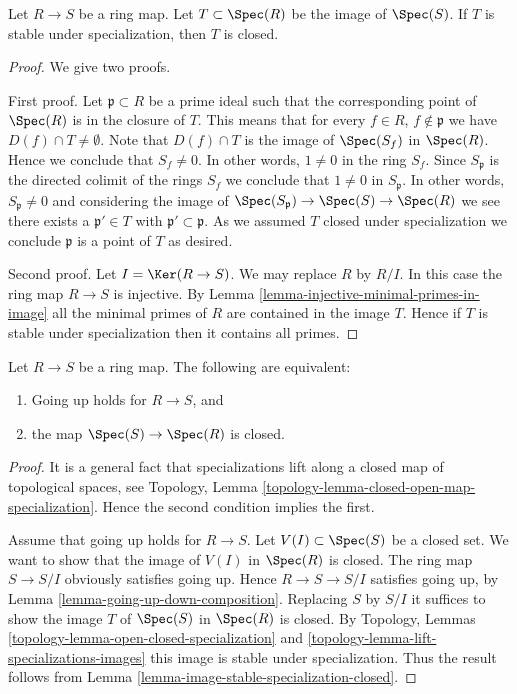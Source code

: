 \begin{lemma}
\label{lemma-image-stable-specialization-closed}
Let $R \to S$ be a ring map. Let $T \subset \Spec(R)$
be the image of $\Spec(S)$. If $T$ is stable under specialization,
then $T$ is closed.
\end{lemma}

\begin{proof}
We give two proofs.

\medskip\noindent
First proof. Let $\mathfrak p \subset R$ be a prime ideal such that
the corresponding point of $\Spec(R)$ is in the closure
of $T$. This means that for every $f \in R$, $f \not \in \mathfrak p$
we have $D(f) \cap T \not = \emptyset$. Note that $D(f) \cap T$
is the image of $\Spec(S_f)$ in $\Spec(R)$. Hence
we conclude that $S_f \not = 0$. In other words, $1 \not = 0$ in
the ring $S_f$. Since $S_{\mathfrak p}$ is the directed colimit
of the rings $S_f$ we conclude that $1 \not = 0$ in
$S_{\mathfrak p}$. In other words, $S_{\mathfrak p} \not = 0$ and
considering the image of $\Spec(S_{\mathfrak p})
\to \Spec(S) \to \Spec(R)$ we see there exists
a $\mathfrak p' \in T$ with $\mathfrak p' \subset \mathfrak p$.
As we assumed $T$ closed under specialization we conclude $\mathfrak p$
is a point of $T$ as desired.

\medskip\noindent
Second proof. Let $I = \Ker(R \to S)$. We may replace $R$ by $R/I$.
In this case the ring map $R \to S$ is injective.
By Lemma \ref{lemma-injective-minimal-primes-in-image}
all the minimal primes of $R$ are contained in the image $T$. Hence
if $T$ is stable under specialization then it contains all primes.
\end{proof}

\begin{lemma}
\label{lemma-going-up-closed}
Let $R \to S$ be a ring map. The following are equivalent:
\begin{enumerate}
\item Going up holds for $R \to S$, and
\item the map $\Spec(S) \to \Spec(R)$ is closed.
\end{enumerate}
\end{lemma}

\begin{proof}
It is a general fact that specializations lift along a
closed map of topological spaces, see
Topology, Lemma \ref{topology-lemma-closed-open-map-specialization}.
Hence the second condition implies the first.

\medskip\noindent
Assume that going up holds for $R \to S$.
Let $V(I) \subset \Spec(S)$ be a closed set.
We want to show that the image of $V(I)$ in $\Spec(R)$ is closed.
The ring map $S \to S/I$ obviously satisfies going up.
Hence $R \to S \to S/I$ satisfies going up,
by Lemma \ref{lemma-going-up-down-composition}.
Replacing $S$ by $S/I$ it suffices to show the image $T$
of $\Spec(S)$ in $\Spec(R)$ is closed.
By Topology, Lemmas \ref{topology-lemma-open-closed-specialization}
and \ref{topology-lemma-lift-specializations-images} this
image is stable under specialization. Thus the result follows
from Lemma \ref{lemma-image-stable-specialization-closed}.
\end{proof}


